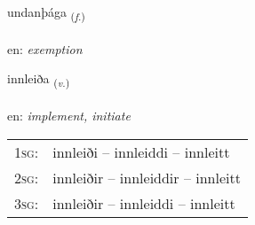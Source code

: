 \documentclass[frontgrid, backgrid]{flacards}\usepackage[]{graphicx}\usepackage[]{xcolor}
\begin{document}
\renewcommand{\flhead}{\vskip5pt \fboxsep=0pt {\small\bfseries\footnotesize Nafnorð | Noun}}
\renewcommand{\fcfoot}{\vskip5pt \fboxsep=0pt \hspace{2pt}{\small\bfseries\footnotesize 3K}}

\renewcommand{\blhead}{\vskip5pt {\small\bfseries\footnotesize Nafnorð | Noun }}
\renewcommand{\bcfoot}{\vskip5pt \hspace{2pt}{\small\bfseries\footnotesize 3K}}


{undanþága \small{\textsubscript{(\textit{f.})}} \\[1ex] %
\textphonetic{[ʏntanθauɣa]} \\
en: \emph{exemption} \\  [2ex]
\renewcommand*{\arraystretch}{0.8}
}

\renewcommand{\flhead}{\vskip5pt \fboxsep=0pt {\small\bfseries\footnotesize Sagnorð | Verb}}
\renewcommand{\fcfoot}{\vskip5pt \fboxsep=0pt \hspace{2pt}{\small\bfseries\footnotesize 3K}}

\renewcommand{\blhead}{\vskip5pt {\small\bfseries\footnotesize Sagnorð | Verb }}
\renewcommand{\bcfoot}{\vskip5pt \hspace{2pt}{\small\bfseries\footnotesize 3K}}


{innleiða \small{\textsubscript{(\textit{v.})}} \\[1ex] %
\textphonetic{[ɪnleiða]} \\
en: \emph{implement, initiate} \\  [2ex]
\renewcommand*{\arraystretch}{0.8}
\begin{tabular}{p{1cm}l}
\textsc{1sg}: & innleiði -- innleiddi -- innleitt \\ 
\textsc{2sg}: & innleiðir -- innleiddir -- innleitt \\ 
\textsc{3sg}: & innleiðir -- innleiddi -- innleitt \\ 
\end{tabular}
}
\end{document}
